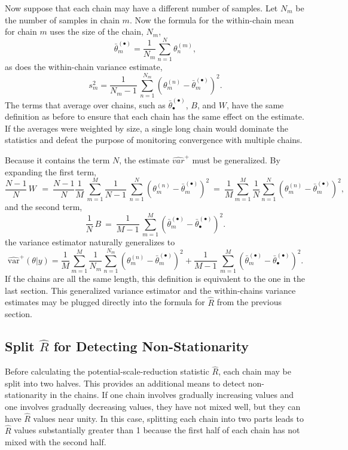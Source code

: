 Now suppose that each chain may have a different number of samples.
Let $N_m$ be the number of samples in chain $m$.  Now the formula for
the within-chain mean for chain $m$ uses the size of the chain, $N_m$,
\[
\bar{\theta}_m^{(\bullet)}
= \frac{1}{N_m} \sum_{n = 1}^N \theta^{(m)}_n,
\]
as does the within-chain variance estimate,
\[
s_m^2 = \frac{1}{N_m-1} \, \sum_{n=1}^{N_m} (\theta^{(n)}_m - \bar{\theta}^{(\bullet)}_m)^2.
\]
The terms that average over chains, such as
$\bar{\theta}^{(\bullet)}_{\bullet}$, $B$, and $W$, have the same
definition as before to ensure that each chain has the same effect on
the estimate.  If the averages were weighted by size, a single long
chain would dominate the statistics and defeat the purpose of
monitoring convergence with multiple chains.

Because it contains the term $N$, the estimate $\widehat{var}^{+}$
must be generalized.  By expanding the first term,
\[
\frac{N-1}{N}\, W \, 
\ = \ 
\frac{N-1}{N} \frac{1}{M} \, \sum_{m=1}^M
\frac{1}{N-1} \, \sum_{n=1}^N (\theta^{(n)}_m -
\bar{\theta}^{(\bullet)}_m)^2
\ = \
\frac{1}{M} 
\sum_{m=1}^M
\frac{1}{N}
\sum_{n=1}^N (\theta^{(n)}_m -
\bar{\theta}^{(\bullet)}_m)^2,
\]
and the second term,
\[
\frac{1}{N}\, B
\ = \
\frac{1}{M-1} \, \sum_{m=1}^M (\bar{\theta}^{(\bullet)}_{m} - \bar{\theta}^{(\bullet)}_{\bullet})^2.
\]
the variance estimator naturally generalizes to
\[
\widehat{\mbox{var}}^{+}\!(\theta|y)
= 
\frac{1}{M} 
\sum_{m=1}^M
\frac{1}{N_m}
\sum_{n=1}^{N_m} (\theta^{(n)}_m -
\bar{\theta}^{(\bullet)}_m)^2
+
\frac{1}{M-1} \, \sum_{m=1}^M (\bar{\theta}^{(\bullet)}_{m} -
\bar{\theta}^{(\bullet)}_{\bullet})^2.
\]
%
If the chains are all the same length, this definition is equivalent
to the one in the last section.  This generalized variance estimator
and the within-chains variance estimates may be plugged directly into
the formula for $\hat{R}$ from the previous section.


\subsection{Split $\hat{R}$ for Detecting Non-Stationarity}

Before calculating the potential-scale-reduction statistic $\hat{R}$,
each chain may be split into two halves.  This provides an additional
means to detect non-stationarity in the chains.  If one chain involves
gradually increasing values and one involves gradually decreasing
values, they have not mixed well, but they can have $\hat{R}$ values
near unity.  In this case, splitting each chain into two parts leads
to $\hat{R}$ values substantially greater than 1 because the first
half of each chain has not mixed with the second half.  


